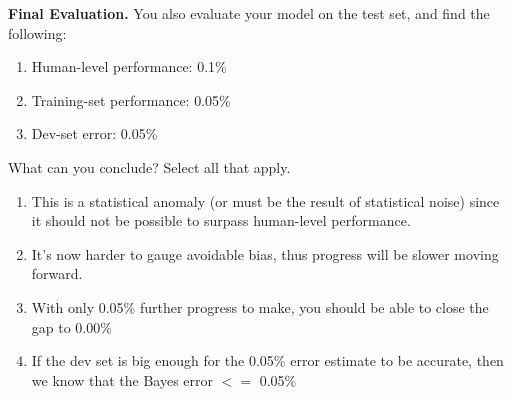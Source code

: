 \item{}
\textbf{Final Evaluation.}
You also evaluate your model on the test set, and find the following:
\begin{enumerate}
    \item Human-level performance: 0.1\%
    \item Training-set performance: 0.05\%
    \item Dev-set error: 0.05\%
\end{enumerate}

What can you conclude? Select all that apply.

\begin{enumerate}[label=(\alph*)]
    \item This is a statistical anomaly (or must be the result of statistical noise) since it should not be possible to surpass human-level performance.
    \item It’s now harder to gauge avoidable bias, thus progress will be slower moving forward.
    \item With only 0.05\% further progress to make, you should be able to close the gap to 0.00\%
    \item If the dev set is big enough for the 0.05\% error estimate to be accurate, then we know that the Bayes error $<=$ 0.05\% 
\end{enumerate} 
